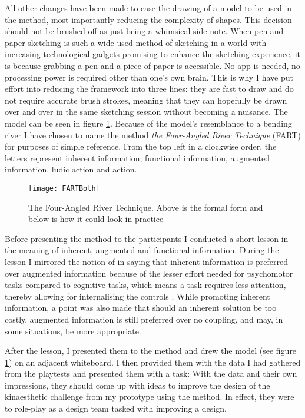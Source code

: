All other changes have been made to ease the drawing of a model to be used in the method, most importantly reducing the complexity of shapes. This decision should not be brushed off as just being a whimsical side note. When pen and paper sketching is such a wide-used method of sketching in a world with increasing technological gadgets promising to enhance the sketching experience, it is because grabbing a pen and a piece of paper is accessible. No app is needed, no processing power is required other than one's own brain. This is why I have put effort into reducing the framework into three lines: they are fast to draw and do not require accurate brush strokes, meaning that they can hopefully be drawn over and over in the same sketching session without becoming a nuisance. The model can be seen in figure \ref{fart}. Because of the model's resemblance to a bending river I have chosen to name the method \textit{the Four-Angled River Technique} (FART) for purposes of simple reference. From the top left in a clockwise order, the letters represent inherent information, functional information, augmented information, ludic action and action.

\begin{figure}[h]
  \centering
  \texttt{[image: FARTBoth]}
  \caption{The Four-Angled River Technique. Above is the formal form and below is how it could look in practice}
  \label{fart}
\end{figure}

Before presenting the method to the participants I conducted a short lesson in the meaning of inherent, augmented and functional information. During the lesson I mirrored the notion of  in saying that inherent information is preferred over augmented information because of the lesser effort needed for psychomotor tasks compared to cognitive tasks, which means a task requires less attention, thereby allowing for internalising the controls \cite{calleja}. While promoting inherent information, a point was also made that should an inherent solution be too costly, augmented information is still preferred over no coupling, and may, in some situations, be more appropriate.

After the lesson, I presented them to the method and drew the model (see figure \ref{fart}) on an adjacent whiteboard. I then provided them with the data I had gathered from the playtests and presented them with a task: With the data and their own impressions, they should come up with ideas to improve the design of the kinaesthetic challenge from my prototype using the method. In effect, they were to role-play as a design team tasked with improving a design.

